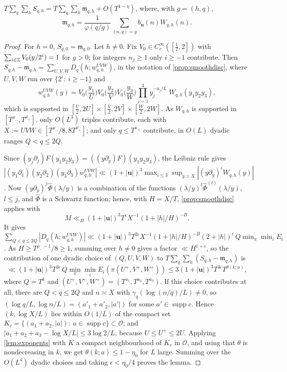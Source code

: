\documentclass[11pt,colorlinks]{charlie}
\begin{document}
\begin{lemma}[Equidistribution]\label{lem:balequi}
$\displaystyle T\sum_q\sum_hS_{q,h}=T\sum_q\sum_h\mathfrak m_{q,h}+O(T^{1-\eta})$, where, with $g=(h,q)$,
\[
 \mathfrak m_{q,h}=\frac1{\varphi(q/g)}\sum_{(n,q)=g}b_{\boldsymbol u}(n)W_{q,h}(n).
\]
\end{lemma}
\begin{proof}
For $h=0$, $S_{q,0}=\mathfrak m_{q,0}$. Let $h\ne0$. Fix $V_0\in C_c^\infty([\frac12,2])$ with $\sum_{i\in\mathbb{Z}}V_0(y/2^i)=1$ for $y>0$; for integers $n_j\ge1$ only $i\ge-1$ contribute. Then $S_{q,h}-\mathfrak m_{q,h}=\sum_{U,V,W}D_q(h;w^{UVW}_{q,h})$, in the notation of \cref{prop:smoothdisc}, where $U,V,W$ run over $\{2^i:\ i\ge-1\}$ and
\[
 w^{UVW}_{q,h}(y)=V_0\Big(\frac{y_1}U\Big)V_0\Big(\frac{y_2}V\Big)V_0\Big(\frac{y_3}W\Big)\prod_{j=1}^3y_j^{-u_j/L}\;W_{q,h}(y_1y_2y_3),
\]
which is supported in $[\frac U2,2U]\times[\frac V2,2V]\times[\frac W2,2W]$. As $W_{q,h}$ is supported in $[T^{\rho_-},T^{\rho_+}]$, only $O(L^3)$ triples contribute, each with $X:=UVW\in[T^{\rho_-}/8,8T^{\rho_+}]$; and only $q\le T^{\kappa_+}$ contribute, in $O(L)$ dyadic ranges $Q<q\le2Q$.

Since $(y_j\partial_j)F(y_1y_2y_3)=((y\partial_y)F)(y_1y_2y_3)$, the Leibniz rule gives $|(y_1\partial_1)(y_2\partial_2)(y_3\partial_3)w^{UVW}_{q,h}|\ll(1+|\boldsymbol u|)^3\max_{i\le3}\sup_{y\asymp X}|(y\partial_y)^iW_{q,h}(y)|$. Now $(y\partial_y)^j\widehat\Phi(\lambda/y)$ is a combination of the functions $(\lambda/y)^l\widehat\Phi^{(l)}(\lambda/y)$, $l\le j$, and $\widehat\Phi$ is a Schwartz function; hence, with $H=X/T$, \cref{prop:smoothdisc} applies with
\[
 M\ll_B(1+|\boldsymbol u|)^3T^\epsilon X^{-1}(1+|h|/H)^{-B}.
\]
It gives $\sum_{Q<q\le2Q}|D_q(h;w^{UVW}_{q,h})|\ll(1+|\boldsymbol u|)^3T^{2\epsilon}X^{-1}(1+|h|/H)^{-B}(2+|h|)^\epsilon\,Q\min_\pi\min_iE_i$. As $H\ge T^{\rho_--1}/8\ge1$, summing over $h\ne0$ gives a factor $\ll H^{1+\epsilon}$, so the contribution of one dyadic choice of $(Q,U,V,W)$ to $T\sum_q\sum_h(S_{q,h}-\mathfrak m_{q,h})$ is
\[
 \ll(1+|\boldsymbol u|)^3T^{3\epsilon}\,Q\min_\pi\min_iE_i(\pi(U^+,V^+,W^+))\le3(1+|\boldsymbol u|)^3T^{3\epsilon}T^{\theta(k;a)},
\]
where $Q=T^k$ and $(U^+,V^+,W^+)=(T^{a_1},T^{a_2},T^{a_3})$. If this choice contributes at all, there are $Q<q\le2Q$ and $n\asymp X$ with $\gamma_q(\log(n/q)/L)\ne0$, so $(\log q/L,\log n/L)=(a'_1+a'_2,|a'|)$ for some $a'\in\operatorname{supp}c$. Hence $(k,\log X/L)$ lies within $O(1/L)$ of the compact set $K_c=\{(a_1+a_2,|a|):\ a\in\operatorname{supp}c\}\subset\mathcal O$; and $|a_1+a_2+a_3-\log X/L|\le3\log2/L$, because $U\le U^+\le2U$. Applying \cref{lem:exponents} with $K$ a compact neighbourhood of $K_c$ in $\mathcal O$, and using that $\theta$ is nondecreasing in $k$, we get $\theta(k;a)\le1-\eta_0$ for $L$ large. Summing over the $O(L^4)$ dyadic choices and taking $\epsilon<\eta_0/4$ proves the lemma.
\end{proof}
\end{document}

